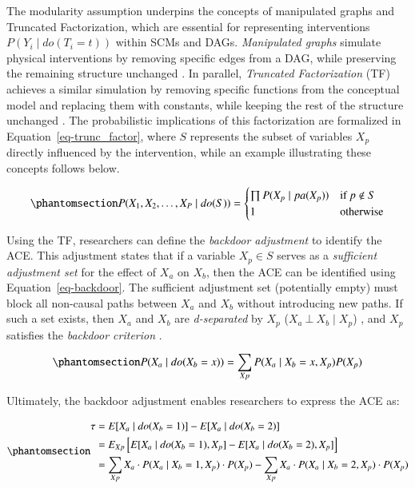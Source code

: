 \documentclass[
  authoryear,
  review,
  1p]{elsarticle}
\begin{document}
The modularity assumption underpins the concepts of manipulated graphs
and Truncated Factorization, which are essential for representing
interventions \(P(Y_{i} \mid do(T_{i}=t))\) within SCMs and DAGs.
\emph{Manipulated graphs} simulate physical interventions by removing
specific edges from a DAG, while preserving the remaining structure
unchanged \citep[p.~34]{Neal_2020}. In parallel, \emph{Truncated
Factorization} (TF) achieves a similar simulation by removing specific
functions from the conceptual model and replacing them with constants,
while keeping the rest of the structure unchanged \citep{Pearl_2010}.
The probabilistic implications of this factorization are formalized in
Equation~\ref{eq-trunc_factor}, where \(S\) represents the subset of
variables \(X_{p}\) directly influenced by the intervention, while an
example illustrating these concepts follows below.

\begin{equation}\phantomsection\label{eq-trunc_factor}{
P(X_{1}, X_{2}, \dots, X_{P} \mid do(S)) =
\begin{cases}
  \prod P(X_{p} \mid pa(X_{p}) ) & \text{if} \: p \not\in S \\
  1 \quad & \text{otherwise}
\end{cases}
}\end{equation}

Using the TF, researchers can define the \emph{backdoor adjustment} to
identify the ACE. This adjustment states that if a variable
\(X_{p} \in S\) serves as a \emph{sufficient adjustment set} for the
effect of \(X_{a}\) on \(X_{b}\), then the ACE can be identified using
Equation~\ref{eq-backdoor}. The sufficient adjustment set (potentially
empty) must block all non-causal paths between \(X_{a}\) and \(X_{b}\)
without introducing new paths. If such a set exists, then \(X_{a}\) and
\(X_{b}\) are \emph{d-separated} by \(X_{p}\)
(\(X_{a} \:\bot\:X_{b} \mid X_{p}\)) \citep{Pearl_2009}, and \(X_{p}\)
satisfies the \emph{backdoor criterion} \citep[p.~37]{Neal_2020}.

\begin{equation}\phantomsection\label{eq-backdoor}{
P(X_{a} \mid do(X_{b}=x)) = \sum_{Xp} P(X_{a} \mid X_{b}=x, X_{p}) P(X_{p})
}\end{equation}

Ultimately, the backdoor adjustment enables researchers to express the
ACE as:

\begin{equation}\phantomsection\label{eq-backdoor_adjustment}{
\begin{aligned}
\tau & = E[X_{a} \mid do(X_{b}=1)]- E[X_{a} \mid do(X_{b}=2)] \\
  & = E_{Xp}\left[ E[X_{a} \mid do(X_{b}=1), X_{p}]- E[X_{a} \mid do(X_{b}=2), X_{p}] \right] \\
  & = \sum_{Xp} X_{a} \cdot P(X_{a} \mid X_{b}=1, X_{p}) \cdot P(X_{p}) - \sum_{Xp} X_{a} \cdot P(X_{a} \mid X_{b}=2, X_{p}) \cdot P(X_{p})
\end{aligned}
}\end{equation}
\end{document}
